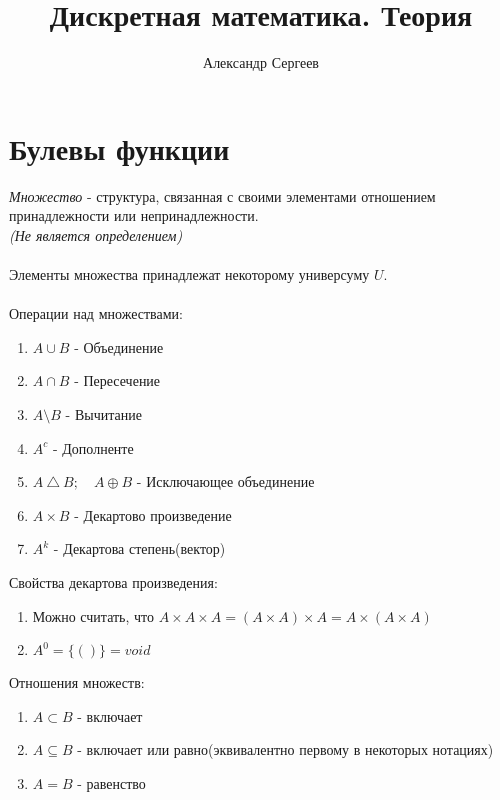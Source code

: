 \documentclass[12pt]{article}
\title{Дискретная математика. Теория}
\author{Александр Сергеев}
\date{}
\begin{document}
\maketitle
\section{Булевы функции}

\textit{Множество} - структура, связанная с своими элементами отношением принадлежности или непринадлежности.\\
\textit{(Не является определением)}\\\\
Элементы множества принадлежат некоторому универсуму $U$.\\\\
Операции над множествами:
\begin{enumerate}
    \item $A \cup B$ - Объединение
    \item $A \cap B$ - Пересечение
    \item $A \setminus B$ - Вычитание
    \item $A^c$ - Дополненте
    \item $A\ \triangle\ B;\quad A \oplus B$ - Исключающее объединение
    \item $A \times B$ - Декартово произведение
    \item $A^k$ - Декартова степень(вектор)
\end{enumerate}
Свойства декартова произведения:
\begin{enumerate}
    \item Можно считать, что $A \times A \times A = (A \times A) \times A = A \times (A \times A)$
    \item $A^0 = \{ () \} = void$
\end{enumerate}
Отношения множеств:
\begin{enumerate}
    \item $A \subset B$ - включает
    \item $A \subseteq B$ - включает или равно(эквивалентно первому в некоторых нотациях)
    \item $A = B$ - равенство
\end{enumerate}
\end{document}
